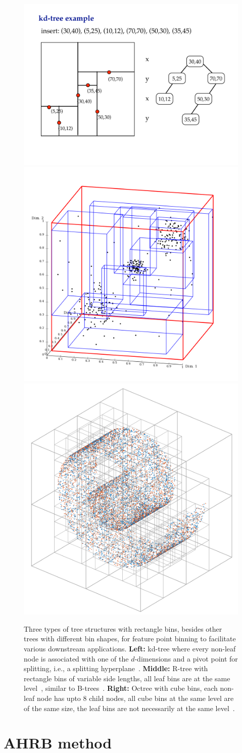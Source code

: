\documentclass[final]{juliacon}
\begin{document}
\begin{figure}
  \centering
  \hspace{-6pt}  
  \includegraphics[width=0.24\linewidth]
  {images/other-trees/kd-tree-new.pdf}
  \hspace{6pt} 
  \includegraphics[width=0.27\linewidth]
  {images/other-trees/r-tree.png}
  \hspace{2pt} 
  \includegraphics[width=0.27\linewidth]
  {images/manifold-embedding/swiss-roll-no-box.png}
  \caption{Three types of tree structures with rectangle bins,
    besides other trees with different bin shapes, for feature
    point binning to facilitate various downstream applications.
    {\bf Left:} kd-tree where every non-leaf node is associated with
    one of the $d$-dimensions and  a pivot point for splitting, i.e., a
    splitting hyperplane~\cite{bentley1975a}.
    {\bf Middle:} R-tree
    with rectangle bins of variable side lengths, all leaf bins are
    at the same level~\cite{guttman1984,beckmann1990},
    similar to B-trees~\cite{bayer1970}.
    {\bf Right:} Octree with cube bins, each non-leaf node has upto
    $8$ child nodes, all cube bins at the same level are of the same
    size, the leaf bins are not necessarily at the same
    level~\cite{freeman1985}. }
\end{figure} %

 

\section{AHRB method} 
\label{sec:method} 
\end{document}
